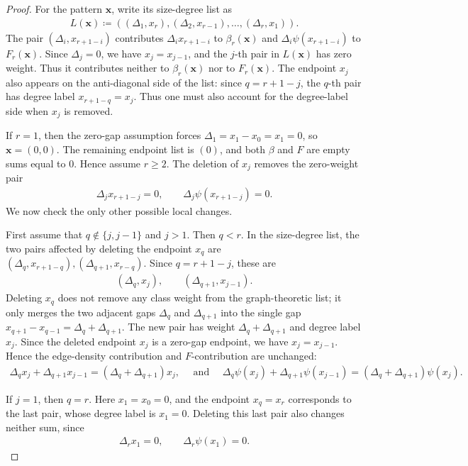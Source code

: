 \documentclass[10pt,a4paper]{article}
\begin{document}
\begin{proof}
For the pattern $\mathbf{x}$, write its size-degree list as
\begin{align*}
  L(\mathbf{x})\coloneqq((\Delta_1,x_r),(\Delta_2,x_{r-1}),\ldots,(\Delta_r,x_1)).
\end{align*}
The pair $(\Delta_i,x_{r+1-i})$ contributes $\Delta_i x_{r+1-i}$ to $\beta_r(\mathbf{x})$ and $\Delta_i\psi(x_{r+1-i})$ to $F_r(\mathbf{x})$.  Since $\Delta_j=0$, we have $x_j=x_{j-1}$, and the $j$-th pair in $L(\mathbf{x})$ has zero weight.  Thus it contributes neither to $\beta_r(\mathbf{x})$ nor to $F_r(\mathbf{x})$.  The endpoint $x_j$ also appears on the anti-diagonal side of the list: since $q=r+1-j$, the $q$-th pair has degree label $x_{r+1-q}=x_j$.  Thus one must also account for the degree-label side when $x_j$ is removed.

If $r=1$, then the zero-gap assumption forces
$\Delta_1=x_1-x_0=x_1=0$, so $\mathbf{x}=(0,0)$.  The remaining endpoint list
is $(0)$, and both $\beta$ and $F$ are empty sums equal to $0$.  Hence assume
$r\ge2$.  The deletion of $x_j$ removes the zero-weight pair
\begin{align*}
  \Delta_jx_{r+1-j}=0,
  \qquad
  \Delta_j\psi(x_{r+1-j})=0.
\end{align*}
We now check the only other possible local changes.

First assume that $q\notin\{j,j-1\}$ and $j>1$.  Then $q<r$.  In the
size-degree list, the two pairs affected by deleting the endpoint $x_q$ are
$
  (\Delta_q,x_{r+1-q}), (\Delta_{q+1},x_{r-q}).
$
Since $q=r+1-j$, these are
\begin{align*}
  (\Delta_q,x_j),\qquad (\Delta_{q+1},x_{j-1}).
\end{align*}
Deleting $x_q$ does not remove any class weight from the graph-theoretic list; it only
merges the two adjacent gaps $\Delta_q$ and
$\Delta_{q+1}$
into the single gap $x_{q+1}-x_{q-1}=\Delta_q+\Delta_{q+1}$.  The new pair has
weight $\Delta_q+\Delta_{q+1}$ and degree label $x_j$.  Since the deleted
endpoint $x_j$ is a zero-gap endpoint, we have $x_j=x_{j-1}$.  Hence the
edge-density contribution and $F$-contribution are unchanged:
\begin{align*}
  \Delta_qx_j+\Delta_{q+1}x_{j-1}=(\Delta_q+\Delta_{q+1})x_j,
\quad\text{ and }\quad
  \Delta_q\psi(x_j)+\Delta_{q+1}\psi(x_{j-1})=(\Delta_q+\Delta_{q+1})\psi(x_j).
\end{align*}

If $j=1$, then $q=r$.  Here $x_1=x_0=0$, and the endpoint $x_q=x_r$ corresponds to the last pair, whose degree label is $x_1=0$.  Deleting this last pair also changes neither sum, since
\begin{align*}
  \Delta_r x_1=0,
  \qquad
  \Delta_r\psi(x_1)=0.
\end{align*}


\end{proof}
\end{document}
